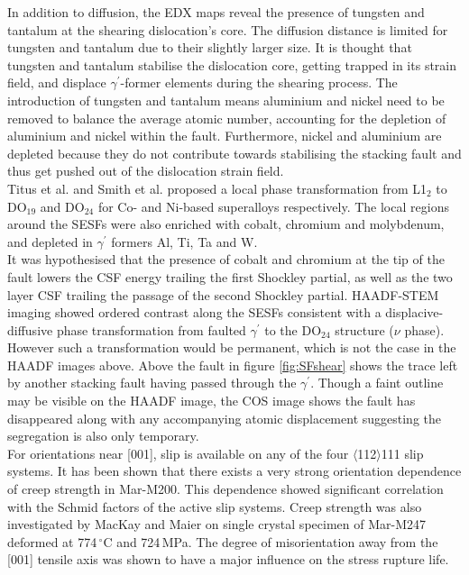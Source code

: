 \documentclass[a4paper,12pt,times,numbered,print,index]{Classes/PhDThesisPSnPDF}
\begin{document}
In addition to diffusion, the EDX maps reveal the presence of tungsten and tantalum at the shearing dislocation's core. The diffusion distance is limited for tungsten and tantalum due to their slightly larger size. It is thought that tungsten and tantalum stabilise the dislocation core, getting trapped in its strain field, and displace $\gamma^{\prime}$-former elements during the shearing process. The introduction of tungsten and tantalum means aluminium and nickel need to be removed to balance the average atomic number, accounting for the depletion of aluminium and nickel within the fault. Furthermore, nickel and aluminium are depleted because they do not contribute towards stabilising the stacking fault and thus get pushed out of the dislocation strain field.\\
Titus et al. and Smith et al. proposed a local phase transformation from L1$_{2}$ to DO$_{19}$ and DO$_{24}$ for Co- and Ni-based superalloys respectively.\citep{} The local regions around the SESFs were also enriched with cobalt, chromium and molybdenum, and depleted in $\gamma^{\prime}$ formers Al, Ti, Ta and W.\\
It was hypothesised that the presence of cobalt and chromium at the tip of the fault lowers the CSF energy trailing the first Shockley partial, as well as the two layer CSF trailing the passage of the second Shockley partial. HAADF-STEM imaging showed ordered contrast along the SESFs consistent with a displacive-diffusive phase transformation from faulted $\gamma^{\prime}$ to the DO$_{24}$ structure ($\nu$ phase). However such a transformation would be permanent, which is not the case in the HAADF images above. Above the fault in figure \ref{fig:SFshear} shows the trace left by another stacking fault having passed through the $\gamma^{\prime}$. Though a faint outline may be visible on the HAADF image, the COS image shows the fault has disappeared along with any accompanying atomic displacement suggesting the segregation is also only temporary.\\
For orientations near [001], slip is available on any of the four $\langle$112$\rangle${111} slip systems. It has been shown that there exists a very strong orientation dependence of creep strength in Mar-M200.\cite{COPLEY197287} This dependence showed significant correlation with the Schmid factors of the active slip systems.
Creep strength was also investigated by MacKay and Maier on single crystal specimen of Mar-M247 deformed at 774\,$^\circ$C and 724\,MPa.\cite{MacKay:1982gd} The degree of misorientation away from the [001] tensile axis was shown to have a major influence on the stress rupture life.
\end{document}
